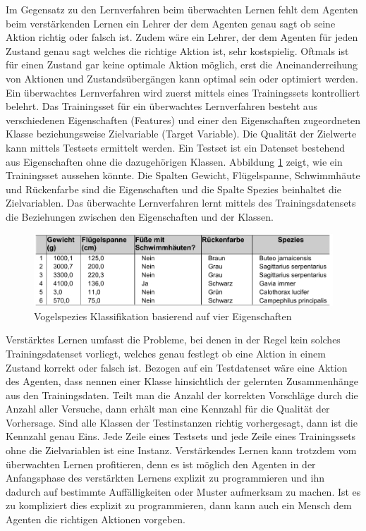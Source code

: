 Im Gegensatz zu den Lernverfahren beim überwachten Lernen fehlt dem Agenten beim verstärkenden Lernen ein Lehrer der dem Agenten genau sagt ob seine Aktion richtig oder falsch ist. Zudem wäre ein Lehrer, der dem Agenten für jeden Zustand genau sagt welches die richtige Aktion ist, sehr kostspielig. Oftmals ist für einen Zustand gar keine optimale Aktion möglich, erst die Aneinanderreihung von Aktionen und Zustandsübergängen kann optimal sein oder optimiert werden\cite[\acs{vgl.} 397]{Alpaydin}. \\

Ein überwachtes Lernverfahren wird zuerst mittels eines Trainingssets kontrolliert belehrt. Das Trainingsset für ein überwachtes Lernverfahren besteht aus verschiedenen Eigenschaften (Features) und einer den Eigenschaften zugeordneten Klasse beziehungsweise Zielvariable (Target Variable). Die Qualität der Zielwerte kann mittels Testsets ermittelt werden. Ein Testset ist ein Datenset bestehend aus Eigenschaften ohne die dazugehörigen Klassen. Abbildung \ref{fig:vogel_spezies} zeigt, wie ein Trainingsset aussehen könnte\cite[8]{Harrington}. Die Spalten Gewicht, Flügelspanne, Schwimmhäute und Rückenfarbe sind die Eigenschaften und die Spalte Spezies beinhaltet die Zielvariablen. Das überwachte Lernverfahren lernt mittels des Trainingsdatensets die Beziehungen zwischen den Eigenschaften und der Klassen. \\

\begin{figure}[!htbp]
  \centering
  \includegraphics[scale = 0.89]{inhalt/abbildungen/vogel_spezies.pdf}
  \caption{Vogelspezies Klassifikation basierend auf vier Eigenschaften}
  \label{fig:vogel_spezies}
\end{figure} 

Verstärktes Lernen umfasst die Probleme, bei denen in der Regel kein solches Trainingsdatenset vorliegt, welches genau festlegt ob eine Aktion in einem Zustand korrekt oder falsch ist. Bezogen auf ein Testdatenset wäre eine Aktion des Agenten, dass nennen einer Klasse hinsichtlich der gelernten Zusammenhänge aus den Trainingsdaten. Teilt man die Anzahl der korrekten Vorschläge durch die Anzahl aller Versuche, dann erhält man eine Kennzahl für die Qualität der Vorhersage. Sind alle Klassen der Testinstanzen richtig vorhergesagt, dann ist die Kennzahl genau Eins. Jede Zeile eines Testsets und jede Zeile eines Trainingssets ohne die Zielvariablen ist eine Instanz. Verstärkendes Lernen kann trotzdem vom überwachten Lernen profitieren, denn es ist möglich den Agenten in der Anfangsphase des verstärkten Lernens explizit zu programmieren und ihn dadurch auf bestimmte Auffälligkeiten oder Muster aufmerksam zu machen. Ist es zu kompliziert dies explizit zu programmieren, dann kann auch ein Mensch dem Agenten die richtigen Aktionen vorgeben. \\

